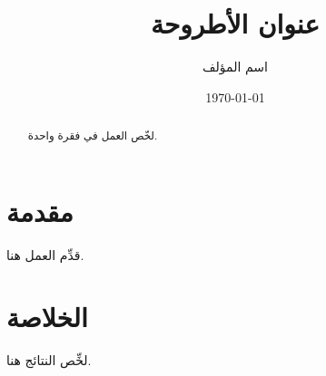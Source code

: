 \documentclass[12pt]{report}
\title{عنوان الأطروحة}
\author{اسم المؤلف}
\date{\today}
\begin{document}
\maketitle

\begin{abstract}
لخّص العمل في فقرة واحدة.
\end{abstract}

\tableofcontents

\chapter{مقدمة}
قدِّم العمل هنا.

\chapter{الخلاصة}
لخِّص النتائج هنا.
\end{document}
